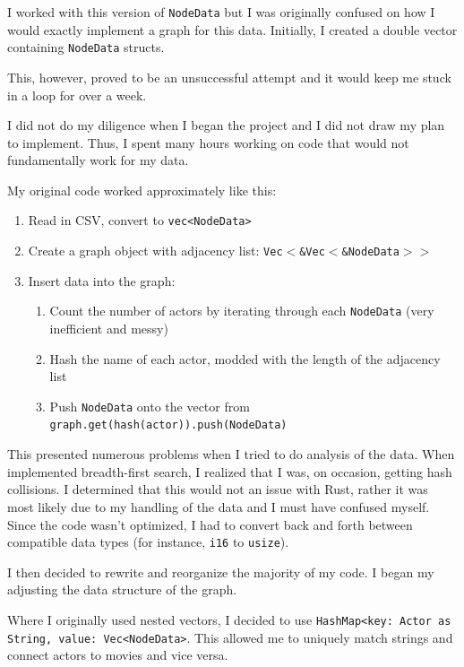 \documentclass[12pt,letterpaper]{article}
\begin{document}
I worked with this version of \texttt{NodeData} but I was originally confused on how I would exactly implement a graph for this data. Initially, I created a double vector containing \texttt{NodeData} structs.  

This, however, proved to be an unsuccessful attempt and it would keep me stuck in a loop for over a week. 

I did not do my diligence when I began the project and I did not draw my plan to implement. Thus,  I spent many hours working on code that would not fundamentally work for my data. 

My original code worked approximately like this: 

\begin{enumerate}
\item Read in CSV,  convert to \texttt{vec<NodeData>}
\item Create a graph object with adjacency list: \texttt{Vec$<$\&Vec$<$\&NodeData$>>$}
\item Insert data into the graph:
	\begin{enumerate}
		\item Count the number of actors by iterating through each \texttt{NodeData} (very inefficient and messy) 
		\item Hash the name of each actor,  modded with the length of the adjacency list
		\item Push \texttt{NodeData} onto the vector from \texttt{graph.get(hash(actor)).push(NodeData)}
	\end{enumerate}

\end{enumerate}

This presented numerous problems when I tried to do analysis of the data.  When implemented breadth-first search, I realized that I was, on occasion,  getting hash collisions. I determined that this would not an issue with Rust, rather it was most likely due to my handling of the data and I must have confused myself.  Since the code wasn't optimized, I had to convert back and forth between compatible data types (for instance, \texttt{i16} to \texttt{usize}). 

I then decided to rewrite and reorganize the majority of my code.  I began my adjusting the data structure of the graph. 

Where I originally used nested vectors,  I decided to use \texttt{HashMap<key: Actor as String, value: Vec<NodeData>}.  This allowed me to uniquely match strings and connect actors to movies and vice versa. 
\end{document}
